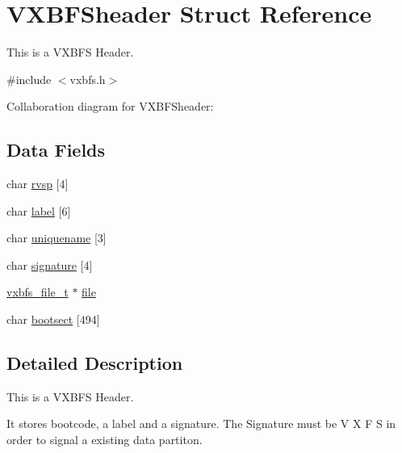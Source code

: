 \hypertarget{a00336}{}\section{V\+X\+B\+F\+Sheader Struct Reference}
\label{a00336}


This is a V\+X\+B\+FS Header.  




{\ttfamily \#include $<$vxbfs.\+h$>$}



Collaboration diagram for V\+X\+B\+F\+Sheader\+:
\subsection*{Data Fields}
\begin{DoxyCompactItemize}
\item 
char \hyperlink{a00336_aad660a962d04482ff03bce38000c1a37_aad660a962d04482ff03bce38000c1a37}{rvsp} \mbox{[}4\mbox{]}
\item 
char \hyperlink{a00336_af3cd6b4358b6ba93a7bd541c09c959c8_af3cd6b4358b6ba93a7bd541c09c959c8}{label} \mbox{[}6\mbox{]}
\item 
char \hyperlink{a00336_af0310ee852d6ec20fe68052fff0d1378_af0310ee852d6ec20fe68052fff0d1378}{uniquename} \mbox{[}3\mbox{]}
\item 
char \hyperlink{a00336_a4c82fb69a08f04d22d832e030cc71577_a4c82fb69a08f04d22d832e030cc71577}{signature} \mbox{[}4\mbox{]}
\item 
\hyperlink{a00206_abb93e2407af0d8fe0f5629ce6456c6f9_abb93e2407af0d8fe0f5629ce6456c6f9}{vxbfs\+\_\+file\+\_\+t} $\ast$ \hyperlink{a00336_a3b903de5c5034494530cdc0c2d4ff9b1_a3b903de5c5034494530cdc0c2d4ff9b1}{file}
\item 
char \hyperlink{a00336_ac10458b5241cce411ef4dd4fff029d0e_ac10458b5241cce411ef4dd4fff029d0e}{bootsect} \mbox{[}494\mbox{]}
\end{DoxyCompactItemize}


\subsection{Detailed Description}
This is a V\+X\+B\+FS Header. 

It stores bootcode, a label and a signature. The Signature must be \textquotesingle{}V\textquotesingle{} \textquotesingle{}X\textquotesingle{} \textquotesingle{}F\textquotesingle{} \textquotesingle{}S\textquotesingle{} in order to signal a existing data partiton. 


